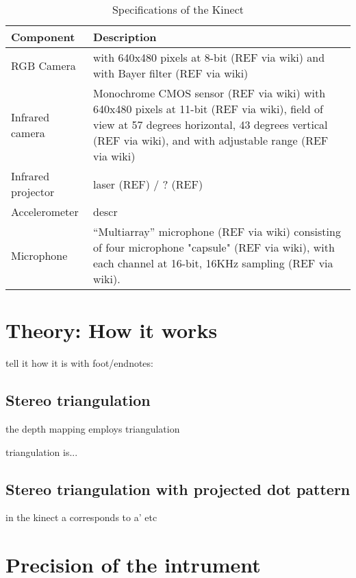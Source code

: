 %
\begin{table}[h]
\centering
\begin{tabular}{l p{10cm}}
\toprule
Component & Description \\
\midrule

RGB Camera & with 640x480 pixels at 8-bit (REF via wiki) and with Bayer filter
(REF via wiki) \\

Infrared camera & Monochrome CMOS sensor (REF via wiki) with 640x480 pixels at
11-bit (REF via wiki), field of view at 57 degrees horizontal, 43 degrees
vertical (REF via wiki), and with adjustable range (REF via wiki) \\ Infrared
projector & laser (REF) / ? (REF) \\

Accelerometer & descr \\

Microphone & ``Multiarray'' microphone (REF via wiki) consisting of four
microphone "capsule" (REF via wiki), with each channel at 16-bit, 16KHz sampling
(REF via wiki). \\

\bottomrule
\end{tabular}
\caption{Specifications of the Kinect}
\label{tab:specs}
\end{table}

\section{Theory: How it works}
\label{howitworks}

tell it how it is with foot/endnotes:

\subsection{Stereo triangulation}

the depth mapping employs triangulation

triangulation is...

\subsection{Stereo triangulation with projected dot pattern}

in the kinect a corresponds to a' etc


\section{Precision of the intrument}
\label{precision}

